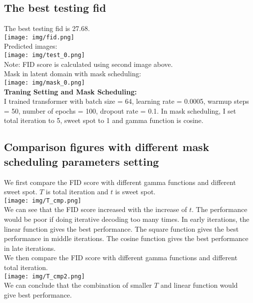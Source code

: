 \documentclass{article} %
\begin{document}
    \subsection{The best testing fid}
    The best testing fid is 27.68.\\
    \texttt{[image: img/fid.png]}\\
    Predicted images:\\
    \texttt{[image: img/test\_0.png]}\\
    Note: FID score is calculated using second image above.\\
    Mask in latent domain with mask scheduling:\\
    \texttt{[image: img/mask\_0.png]}\\
    \textbf{Traning Setting and Mask Scheduling:}\\
    I trained transformer with batch size = 64, learning rate = 0.0005, warmup steps = 50, number of epochs = 100, dropout rate = 0.1.
    In mask scheduling, I set total iteration to 5, sweet spot to 1 and gamma function is cosine.\\

    \subsection{Comparison figures with different mask scheduling parameters setting}
    We first compare the FID score with different gamma functions and different sweet spot. $T$ is total iteration and $t$ is sweet spot.\\
    \texttt{[image: img/T\_cmp.png]}\\
    We can see that the FID score increased with the increase of $t$. The performance would be poor if doing iterative decoding too many times.
    In early iterations, the linear function gives the best performance. The square function gives the best performance in middle iterations. The cosine function gives the best performance in late iterations.\\
    We then compare the FID score with different gamma functions and different total iteration.\\
    \texttt{[image: img/T\_cmp2.png]}\\
    We can conclude that the combination of smaller $T$ and linear function would give best performance.\\
\end{document}
